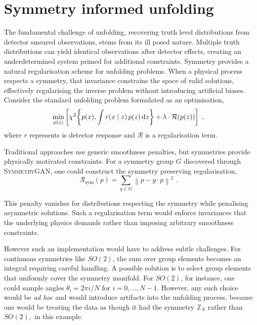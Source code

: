 \section{Symmetry informed unfolding}
\label{sec:symmetry-informed-unfolding}
\sectionminitoc
    The fundamental challenge of unfolding, recovering truth level distributions from detector smeared observations, stems from its ill posed nature.
    Multiple truth distributions can yield identical observations after detector effects, creating an underdetermined system primed for additional constraints.
    Symmetry provides a natural regularisation scheme for unfolding problems.
    When a physical process respects a symmetry, that invariance constrains the space of valid solutions, effectively regularising the inverse problem without introducing artificial biases.
    Consider the standard unfolding problem formulated as an optimisation,
    \[
        \min_{p(z)} \left[ \chi^2\qty{p(x), \int r(x\mid z) \, p(z)\,\dd z} + \lambda \cdot \mathcal{R}(p(z)) \right]\;,
    \]
    where \(r\) represents is detector response and \(\mathcal{R}\) is a regularisation term.
    
    Traditional approaches use generic smoothness penalties, but symmetries provide physically motivated constraints.
    For a symmetry group \(G\) discovered through \textsc{SymmetryGAN}, one could construct the symmetry preserving regularisation,
    \[
        \mathcal{R}_\text{sym}(p) = \sum_{g \in G} \left\| p - g \cdot p \right\|^2\;.
    \]
    
    This penalty vanishes for distributions respecting the symmetry while penalising asymmetric solutions.
    Such a regularisation term would enforce invariances that the underlying physics demands rather than imposing arbitrary smoothness constraints.
    
    However such an implementation would have to address subtle challenges.
    For continuous symmetries like \(SO(2)\), the sum over group elements becomes an integral requiring careful handling.
    A possible solution is to select group elements that uniformly cover the symmetry manifold.
    For \(SO(2)\), for instance, one could sample angles \(\theta_i = 2\pi i/N\) for \(i = 0, ..., N-1\).
    However, any such choice would be \textit{ad hoc} and would introduce artifacts into the unfolding process, because one would be treating the data as though it had the symmetry \(\mathbb{Z}_N\) rather than \(SO(2),\) in this example.

